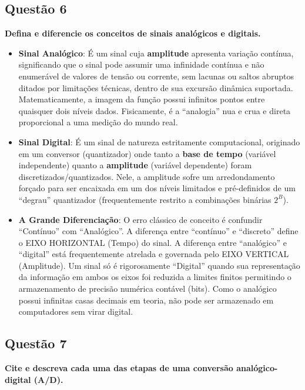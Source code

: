 \subsection{Questão 6}\label{questuxe3o-6}

\textbf{Defina e diferencie os conceitos de sinais analógicos e digitais.}

\begin{itemize}
\tightlist
\item
  \textbf{Sinal Analógico}: É um sinal cuja \textbf{amplitude} apresenta variação contínua, significando que o sinal pode assumir uma infinidade contínua e não enumerável de valores de tensão ou corrente, sem lacunas ou saltos abruptos ditados por limitações técnicas, dentro de sua excursão dinâmica suportada. Matematicamente, a imagem da função possui infinitos pontos entre quaisquer dois níveis dados. Fisicamente, é a ``analogia'' nua e crua e direta proporcional a uma medição do mundo real.
\item
  \textbf{Sinal Digital}: É um sinal de natureza estritamente computacional, originado em um conversor (quantizador) onde tanto a \textbf{base de tempo} (variável independente) quanto a \textbf{amplitude} (variável dependente) foram discretizados/quantizados. Nele, a amplitude sofre um arredondamento forçado para ser encaixada em um dos níveis limitados e pré-definidos de um ``degrau'' quantizador (frequentemente restrito a combinações binárias \(2^B\)).
\item
  \textbf{A Grande Diferenciação}: O erro clássico de conceito é confundir ``Contínuo'' com ``Analógico''. A diferença entre ``contínuo'' e ``discreto'' define o EIXO HORIZONTAL (Tempo) do sinal. A diferença entre ``analógico'' e ``digital'' está frequentemente atrelada e governada pelo EIXO VERTICAL (Amplitude). Um sinal só é rigorosamente ``Digital'' quando sua representação da informação em ambos os eixos foi reduzida a limites finitos permitindo o armazenamento de precisão numérica contável (bits). Como o analógico possui infinitas casas decimais em teoria, não pode ser armazenado em computadores sem virar digital.
\end{itemize}

\subsection{Questão 7}\label{questuxe3o-7}

\textbf{Cite e descreva cada uma das etapas de uma conversão analógico-digital (A/D).}

